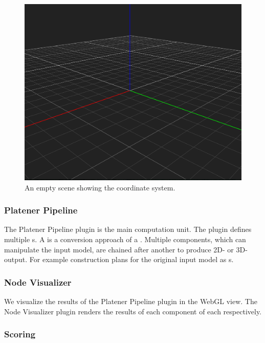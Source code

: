 \documentclass[../ClassicThesis.tex]{subfiles}
\begin{document}
\begin{figure}
\label{fig:architecture_overview_coordinate_system}
\includegraphics[width=1\columnwidth]{Images/03-architecture_overview_coordinate_system.png}
\caption{An empty scene showing the coordinate system.}
\end{figure}

\subsubsection{Platener Pipeline}

The Platener Pipeline plugin is the main computation unit. The plugin defines multiple {\fabmethod}s. A {\fabmethod} is a conversion approach of a \threedmodel. Multiple components, which can manipulate the input model, are chained after another to produce 2D- or 3D-output. For example construction plans for the original input model as {\svgfile}s. 

\subsubsection{Node Visualizer}

We visualize the results of the Platener Pipeline plugin in the WebGL view. The Node Visualizer plugin renders the results of each component of each {\fabmethod} respectively.

\subsubsection{Scoring}
\end{document}
